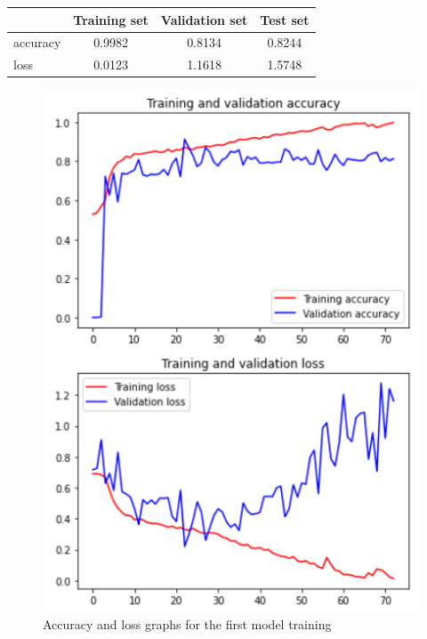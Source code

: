 \documentclass[11pt,a4paper,oneside]{article}
\begin{document}
\begin{center}
\begin{tabular}{|l|ccc|}
\hline
 & Training set & Validation set & Test set \\
\hline
accuracy & 0.9982 & 0.8134 & 0.8244 \\
loss & 0.0123 & 1.1618 & 1.5748 \\
\hline
\end{tabular}
\end{center}

\begin{figure}[h]
\centering
	\begin{minipage}[c]{.35\textwidth}
		\centering\setlength{\captionmargin}{0pt}%
		\includegraphics[width=.9\textwidth]{images/scratch_accuracy}
		\caption{Accuracy and loss graphs for the first model training}
		\label{fig:scratch_accuracy}
	\end{minipage}
	\hspace{5mm}%
	\begin{minipage}[c]{.35\textwidth}
		\centering\setlength{\captionmargin}{0pt}%

\end{minipage}
\end{figure}
\end{document}
